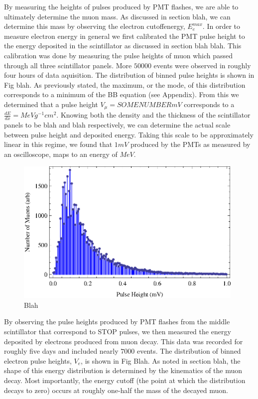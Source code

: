 By measuring the heights of pulses produced by PMT flashes, we are
able to ultimately determine the muon mass.  As discussed in section
blah, we can determine this mass by observing the electron cutoffenergy, $E_{e}^{max}$. In order to measure electron energy in general
we first calibrated the PMT pulse height to the energy deposited in
the scintillator as discussed in section blah blah. This calibration
was done by measuring the pulse heights of muon which passed through
all three scintillator panels.  More $50000$ events were observed in
roughly four hours of data aquisition.  The distribution of binned
pulse heights is shown in Fig blah.  As previously stated, the
maximum, or the mode, of this distribution corresponds to a minimum of
the BB equation (see Appendix).  From this we determined that a pulse
height $V_{\mu} = SOME NUMBER mV$ corresponds to a $\frac{dE}{dx}= MeV
g^{-1} cm^{2}$.  Knowing both the density and the thickness of the
scintillator panels to be blah and blah respectively, we can determine
the actual scale between pulse height and deposited energy.  Taking
this scale to be approximately linear in this regime, we found that
$1mV$ produced by the PMTs as measured by an oscilloscope, maps to an
energy of $MeV$.


\begin{figure}[htbp]
\begin{center}
\includegraphics[height=70mm]{./figures/Muon_Pulse_Height.eps}
\caption{Blah}
\label{figure:logic}
\end{center}
\end{figure}

By observing the pulse heights produced by PMT flashes from the middle scintillator that correspond to STOP pulses, we then measured the energy deposited by electrons produced from muon decay.  This data was recorded for roughly five days and included nearly $7000$ events.  The distribution of binned electron pulse heights, $V_{e}$, is shown in Fig Blah.  As noted in section blah, the shape of this energy distribution is determined by the kinematics of the muon decay.  Most importantly, the energy cutoff (the point at which the distribution decays to zero) occurs at roughly one-half the mass of the decayed muon.

